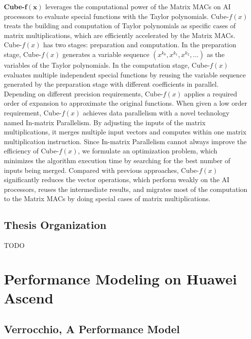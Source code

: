 \documentclass[12pt]{extbook}
\begin{document}
\textbf{Cube-}$\mathbf{f(x)}$ leverages the computational power of the Matrix MACs on AI processors to evaluate special functions with the Taylor polynomials. Cube-${f(x)}$ treats the building and computation of Taylor polynomials as specific cases of matrix multiplications, which are efficiently accelerated by the Matrix MACs. Cube-${f(x)}$ has two stages: preparation and computation. In the preparation stage, Cube-${f(x)}$ generates a variable sequence $(x^{k_0}, x^{k_1}, x^{k_2}, ...)$ as the variables of the Taylor polynomials. In the computation stage, Cube-${f(x)}$ evaluates multiple independent special functions by reusing the variable sequence generated by the preparation stage with different coefficients in parallel. Depending on different precision requirements, Cube-${f(x)}$ applies a required order of expansion to approximate the original functions. When given a low order requirement, Cube-${f(x)}$ achieves data parallelism with a novel technology named In-matrix Parallelism. By adjusting the inputs of the matrix multiplications, it merges multiple input vectors and computes within one matrix multiplication instruction. Since In-matrix Parallelism cannot always improve the efficiency of Cube-${f(x)}$, we formulate an optimization problem, which minimizes the algorithm execution time by searching for the best number of inputs being merged. Compared with previous approaches, Cube-${f(x)}$ significantly reduces the vector operations, which perform weakly on the AI processors, reuses the intermediate results, and migrates most of the computation to the Matrix MACs by doing special cases of matrix multiplications.

\section{Thesis Organization}
\label{sec_1_4_organization}

TODO


\chapter{Performance Modeling on Huawei Ascend}
\label{sec_2}

\section{Verrocchio, A Performance Model}
\label{sec_2_1}
\end{document}
